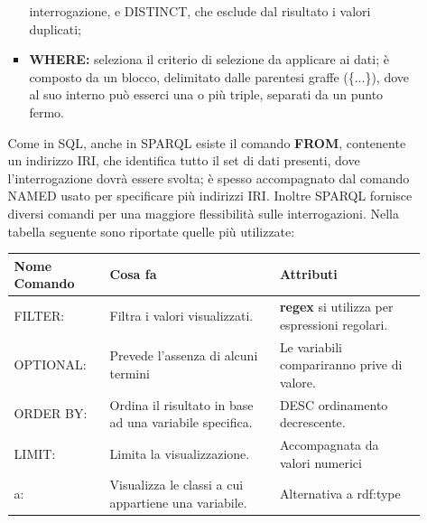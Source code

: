 \documentclass[a4paper,11pt]{article}
\begin{document}
\begin{enumerate}
\begin{enumerate}[label*=\arabic*.]
\begin{itemize}
interrogazione, e DISTINCT, che esclude dal risultato i valori
duplicati;
		\item \textbf{WHERE:} seleziona il criterio di selezione da applicare ai dati; è composto da un blocco, delimitato dalle parentesi graffe (\{...\}),
dove al suo interno può esserci una o più triple, separati da un
punto fermo.
	\end{itemize}
Come in SQL, anche in SPARQL esiste il comando \textbf{FROM}, contenente un
indirizzo IRI, che identifica tutto il set di dati presenti, dove l'interrogazione dovrà essere svolta; è spesso accompagnato dal comando NAMED usato per specificare più indirizzi IRI.
Inoltre SPARQL fornisce diversi comandi per una maggiore flessibilità sulle
interrogazioni. Nella tabella seguente sono riportate quelle più utilizzate:
\begin{table}[htb]
		\begin{center}				
		\begin{tabular}{|>{\small}l|>{\small}l|>{\small}l|}
				\hline
				\textbf{Nome Comando} & \textbf{Cosa fa} & \textbf{Attributi}\\				
				\hline
FILTER: & Filtra i valori visualizzati. & \textbf{regex} si utilizza per espressioni regolari.\\
				\hline
OPTIONAL: & Prevede l'assenza di alcuni termini & Le variabili compariranno prive di valore.\\
				\hline
ORDER BY: & Ordina il risultato in base ad una variabile specifica. & DESC ordinamento decrescente. \\
				\hline
LIMIT: & Limita la visualizzazione. & Accompagnata da valori numerici \\
				\hline
a:	& Visualizza le classi a cui appartiene una variabile. & Alternativa a rdf:type\\


\end{tabular}
\end{center}
\end{table}
\end{enumerate}
\end{enumerate}
\end{document}
